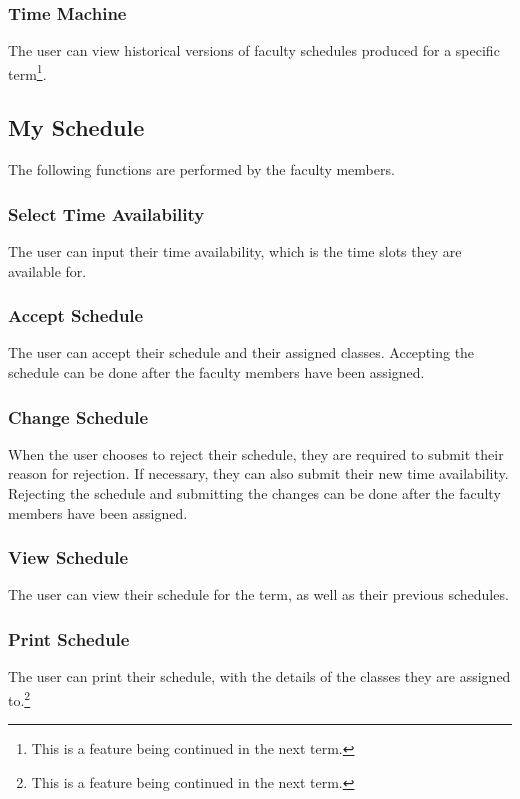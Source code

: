         \subsubsection{Time Machine}
        The user can view historical versions of faculty schedules produced for a specific term\footnote{This is a feature being continued in the next term.}.
    
    \subsection{My Schedule}
    The following functions are performed by the faculty members.
    
        \subsubsection{Select Time Availability}
        The user can input their time availability, which is the time slots they are available for.
        
        \subsubsection{Accept Schedule}
        The user can accept their schedule and their assigned classes. Accepting the schedule can be done after the faculty members have been assigned.
        
        \subsubsection{Change Schedule}
        When the user chooses to reject their schedule, they are required to submit their reason for rejection. If necessary, they can also submit their new time availability. Rejecting the schedule and submitting the changes can be done after the faculty members have been assigned.
        
        \subsubsection{View Schedule}
        The user can view their schedule for the term, as well as their previous schedules.
        
        \subsubsection{Print Schedule}
        The user can print their schedule, with the details of the classes they are assigned to.\footnote{This is a feature being continued in the next term.}
        
